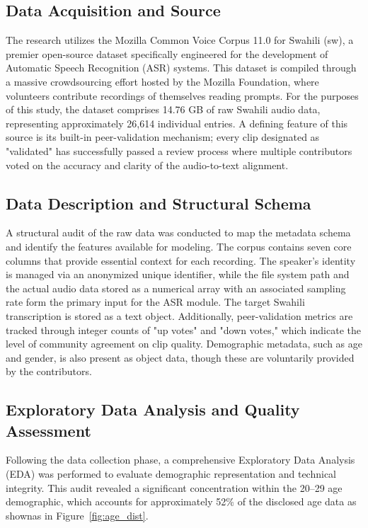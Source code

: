 \subsection{Data Acquisition and Source}
The research utilizes the Mozilla Common Voice Corpus 11.0 for Swahili (sw), a premier open-source dataset specifically engineered for the development of Automatic Speech Recognition (ASR) systems. This dataset is compiled through a massive crowdsourcing effort hosted by the Mozilla Foundation, where volunteers contribute recordings of themselves reading prompts. For the purposes of this study, the dataset comprises 14.76 GB of raw Swahili audio data, representing approximately 26,614 individual entries. A defining feature of this source is its built-in peer-validation mechanism; every clip designated as "validated" has successfully passed a review process where multiple contributors voted on the accuracy and clarity of the audio-to-text alignment.

\subsection{Data Description and Structural Schema}
A structural audit of the raw data was conducted to map the metadata schema and identify the features available for modeling. The corpus contains seven core columns that provide essential context for each recording. The speaker’s identity is managed via an anonymized unique identifier, while the file system path and the actual audio data stored as a numerical array with an associated sampling rate form the primary input for the ASR module. The target Swahili transcription is stored as a text object. Additionally, peer-validation metrics are tracked through integer counts of "up votes" and "down votes," which indicate the level of community agreement on clip quality. Demographic metadata, such as age and gender, is also present as object data, though these are voluntarily provided by the contributors.

\subsection{Exploratory Data Analysis and Quality Assessment}
Following the data collection phase, a comprehensive Exploratory Data Analysis (EDA) was performed to evaluate demographic representation and technical integrity. This audit revealed a significant concentration within the 20--29 age demographic, which accounts for approximately 52\% of the disclosed age data as shownas in Figure~\ref{fig:age_dist}.

